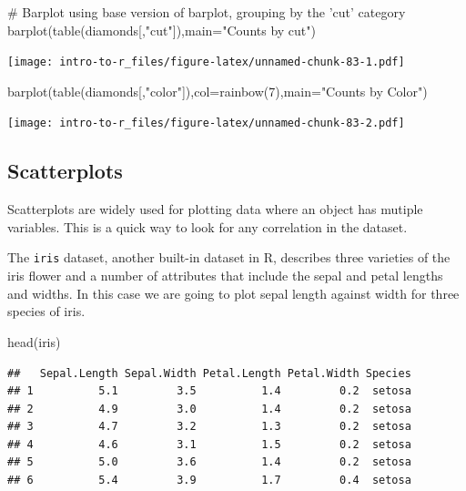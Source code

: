 \documentclass[a4paper]{book}
\newenvironment{Shaded}{}{}
\newcommand{\KeywordTok}[1]{\textcolor[rgb]{0.00,0.00,1.00}{{#1}}}
\newcommand{\DataTypeTok}[1]{{#1}}
\newcommand{\DecValTok}[1]{{#1}}
\newcommand{\StringTok}[1]{\textcolor[rgb]{0.00,0.50,0.50}{{#1}}}
\newcommand{\CommentTok}[1]{\textcolor[rgb]{0.00,0.50,0.00}{{#1}}}
\newcommand{\NormalTok}[1]{{#1}}
\newlength{\leftbarwidth}
\newlength{\leftbarsep}
\newcommand*{\leftbarcolorcmd}{\color{darkgray}}%
\renewenvironment{leftbar}{%
    \def\FrameCommand{{\leftbarcolorcmd{\vrule width \leftbarwidth\relax\hspace {\leftbarsep}}}}%
    \MakeFramed {\advance \hsize -\width \FrameRestore }%
}{%
    \endMakeFramed
}
\renewenvironment{Shaded}
{\vspace{0em}\begin{leftbar}\begin{snugshade}}
{\end{snugshade}\end{leftbar}\vspace{0pt}}
\begin{document}
\begin{Shaded}
\begin{Highlighting}[]
\CommentTok{# Barplot using base version of barplot, grouping by the 'cut' category}
\KeywordTok{barplot}\NormalTok{(}\KeywordTok{table}\NormalTok{(diamonds[,}\StringTok{"cut"}\NormalTok{]),}\DataTypeTok{main=}\StringTok{"Counts by cut"}\NormalTok{)}
\end{Highlighting}
\end{Shaded}

\texttt{[image: intro-to-r\_files/figure-latex/unnamed-chunk-83-1.pdf]}

\begin{Shaded}
\begin{Highlighting}[]
\KeywordTok{barplot}\NormalTok{(}\KeywordTok{table}\NormalTok{(diamonds[,}\StringTok{"color"}\NormalTok{]),}\DataTypeTok{col=}\KeywordTok{rainbow}\NormalTok{(}\DecValTok{7}\NormalTok{),}\DataTypeTok{main=}\StringTok{"Counts by Color"}\NormalTok{)}
\end{Highlighting}
\end{Shaded}

\texttt{[image: intro-to-r\_files/figure-latex/unnamed-chunk-83-2.pdf]}

\subsection{Scatterplots}\label{scatterplots}

Scatterplots are widely used for plotting data where an object has
mutiple variables. This is a quick way to look for any correlation in
the dataset.

The \texttt{iris} dataset, another built-in dataset in R, describes
three varieties of the iris flower and a number of attributes that
include the sepal and petal lengths and widths. In this case we are
going to plot sepal length against width for three species of iris.

\begin{Shaded}
\begin{Highlighting}[]
\KeywordTok{head}\NormalTok{(iris)}
\end{Highlighting}
\end{Shaded}

\begin{verbatim}
##   Sepal.Length Sepal.Width Petal.Length Petal.Width Species
## 1          5.1         3.5          1.4         0.2  setosa
## 2          4.9         3.0          1.4         0.2  setosa
## 3          4.7         3.2          1.3         0.2  setosa
## 4          4.6         3.1          1.5         0.2  setosa
## 5          5.0         3.6          1.4         0.2  setosa
## 6          5.4         3.9          1.7         0.4  setosa
\end{verbatim}
\end{document}
